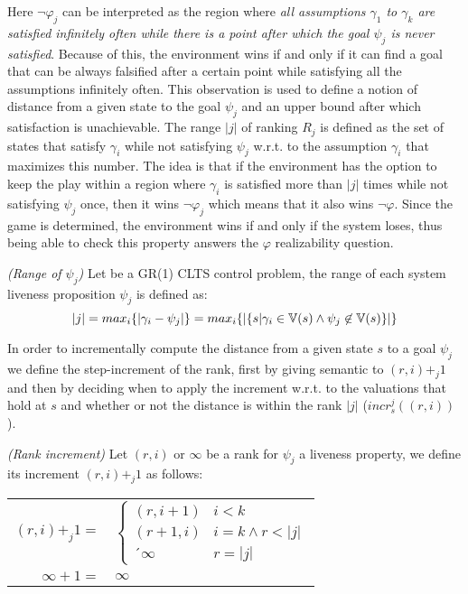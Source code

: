 Here $\neg\varphi_j$ can be interpreted as the region where \emph{all assumptions $\gamma_1$ to $\gamma_k$ are satisfied infinitely often while there is a point after which the goal $\psi_j$ is never satisfied}. Because of this, the environment wins if and only if it can find a goal that can be always falsified after a certain point while satisfying all the assumptions infinitely often. This observation is used to define a notion of distance from a given state to the goal $\psi_j$ and an upper bound after which satisfaction is unachievable. The range $|j|$ of ranking $R_j$ is defined as the set of states that satisfy $\gamma_i$ while not satisfying $\psi_j$ w.r.t. to the assumption $\gamma_i$ that maximizes this number. The idea is that if the environment has the option to keep the play within a region where $\gamma_i$ is satisfied more than $|j|$ times while not satisfying $\psi_j$ once, then it wins $\neg\varphi_j$ which means that it also wins $\neg\varphi$.  Since the game is determined, the environment wins if and only if the system loses, thus being able to check this property answers the $\varphi$ realizability question.


\begin{definition}\label{def:gr1_range_j} \emph{(Range of $\psi_j$)} 
Let \controlProblemDef be a GR(1) CLTS control problem, the range of each system liveness proposition $\psi_j$ is defined as:
\[|j|=max_i\{|\gamma_i - \psi_j|\} = max_i \{ | \{ s | \gamma_i \in \mathbb{V} (s) \wedge  \psi_j \not\in \mathbb{V} (s) \} | \} \]
\end{definition}

In order to incrementally compute the distance from a given state $s$ to a goal $\psi_j$ we define the step-increment of the rank, first by giving semantic to $(r,i)+_j 1$ and then by deciding when to apply the increment w.r.t. to the valuations that hold at $s$ and whether or not the distance is within the rank $|j|$ ($incr_s^j((r,i))$).

\begin{definition}\label{def:gr1_rank_increment} \emph{(Rank increment)} 
	Let $(r,i)$ or $\infty$ be a rank for $\psi_j$ a liveness property, we define its increment $(r,i)+_j 1$ as follows:
\begin{center}
	\begin{tabular}{r l}
		$(r,i)+_j 1 = $ & $\begin{cases}
		(r,i+1) & i < k\\
		(r+1,i) & i = k \wedge r < |j|\\
		´\infty & r = |j|
		\end{cases}$\\
		$\infty + 1 = $ & $\infty$\\
	\end{tabular}
\end{center}
\end{definition}



